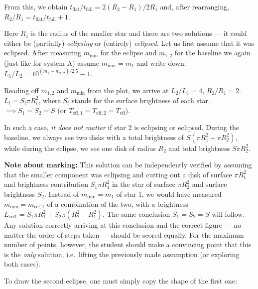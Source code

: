 From this, we obtain
$t_{\mathrm{flat}}/t_{\mathrm{fall}} = 2(R_2 - R_1)/2R_1$ and, after
rearranging, $R_2/R_1 = t_{\mathrm{flat}}/t_{\mathrm{fall}} + 1$.

Here $R_1$ is the radius of the smaller star and there are two solutions --- it
could either be (partially) \emph{eclipsing} or (entirely) \emph{eclipsed}.
Let us first assume that it was eclipsed. After measuring $m_{\min}$ for the
eclipse and $m_{1,2}$ for the baseline we again (just like for system A) assume
$m_{\min} = m_1$ and write down: $L_1/L_2 = 10^{(m_1 - m_{1,2})/2.5} - 1$.

Reading off $m_{1,2}$ and $m_{\min}$ from the plot, we arrive at $L_2/L_1 = 4$,
$R_2/R_1 = 2$.\\
$L_i = S_i \pi R_i^2$, where $S_i$ stands for the surface brightness of each
star.\\
$\implies S_1 = S_2 = S$ (or
$T_{\mathrm{eff},1} = T_{\mathrm{eff},2} = T_{\mathrm{eff}}$).

In such a case, \emph{it does not matter} if star 2 is eclipsing or eclipsed.
During the baseline, we always see two disks with a total brightness of
$S(\pi R_1^2 + \pi R_2^2)$, while during the eclipse, we see one disk of radius
$R_2$ and total brightness $S\pi R_2^2$.

\textbf{Note about marking:} This solution can be independently verified by
assuming that the smaller component was eclipsing and cutting out a disk of
surface $\pi R_1^2$ and brightness contribution $S_1 \pi R_1^2$ in the star of
surface $\pi R_2^2$ and surface brightness $S_2$. Instead of
$m_{\min} = m_1$ of star 1, we would have measured
$m_{\min} = m_{\mathrm{ecl},1}$ of a combination of the two, with a brightness
$L_{ecl1} = S_1 \pi R_1^2 + S_2 \pi (R_2^2 - R_1^2)$. The same conclusion
$S_1 = S_2 = S$ will follow. Any solution correctly arriving at this conclusion
and the correct figure --- no matter the order of steps taken --- should be
scored equally. For the maximum number of points, however, the student should
make a convincing point that this is the \emph{only} solution, i.e.\ lifting
the previously made assumption (or exploring both cases).

To draw the second eclipse, one must simply copy the shape of the first one:

